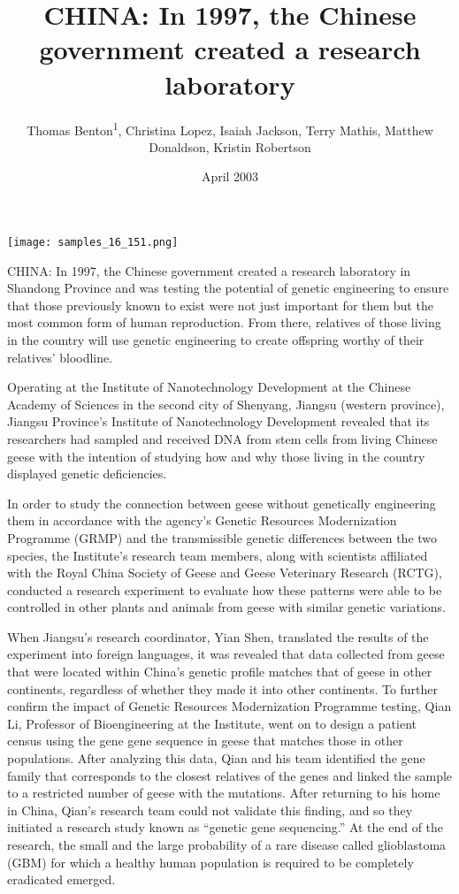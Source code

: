 \documentclass{article}
\title{CHINA: In 1997, the Chinese government created a research laboratory}
\author{Thomas Benton\textsuperscript{1},  Christina Lopez,  Isaiah Jackson,  Terry Mathis,  Matthew Donaldson,  Kristin Robertson}
\affil{\textsuperscript{1}Augustana University}
\date{April 2003}
\begin{document}
\maketitle

\begin{center}
\begin{minipage}{0.75\linewidth}
\texttt{[image: samples\_16\_151.png]}
\end{minipage}
\end{center}

CHINA: In 1997, the Chinese government created a research laboratory in Shandong Province and was testing the potential of genetic engineering to ensure that those previously known to exist were not just important for them but the most common form of human reproduction. From there, relatives of those living in the country will use genetic engineering to create offspring worthy of their relatives’ bloodline.

Operating at the Institute of Nanotechnology Development at the Chinese Academy of Sciences in the second city of Shenyang, Jiangsu (western province), Jiangsu Province’s Institute of Nanotechnology Development revealed that its researchers had sampled and received DNA from stem cells from living Chinese geese with the intention of studying how and why those living in the country displayed genetic deficiencies.

In order to study the connection between geese without genetically engineering them in accordance with the agency’s Genetic Resources Modernization Programme (GRMP) and the transmissible genetic differences between the two species, the Institute’s research team members, along with scientists affiliated with the Royal China Society of Geese and Geese Veterinary Research (RCTG), conducted a research experiment to evaluate how these patterns were able to be controlled in other plants and animals from geese with similar genetic variations.

When Jiangsu’s research coordinator, Yian Shen, translated the results of the experiment into foreign languages, it was revealed that data collected from geese that were located within China’s genetic profile matches that of geese in other continents, regardless of whether they made it into other continents. To further confirm the impact of Genetic Resources Modernization Programme testing, Qian Li, Professor of Bioengineering at the Institute, went on to design a patient census using the gene gene sequence in geese that matches those in other populations. After analyzing this data, Qian and his team identified the gene family that corresponds to the closest relatives of the genes and linked the sample to a restricted number of geese with the mutations. After returning to his home in China, Qian’s research team could not validate this finding, and so they initiated a research study known as “genetic gene sequencing.” At the end of the research, the small and the large probability of a rare disease called glioblastoma (GBM) for which a healthy human population is required to be completely eradicated emerged.
\end{document}
